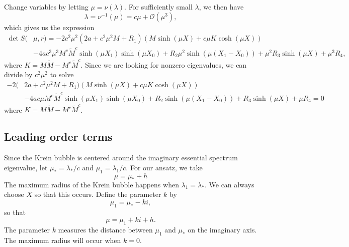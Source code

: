 \documentclass[10pt,reqno]{amsart}
\theoremstyle{plain}
\theoremstyle{definition}
\theoremstyle{remark}
\numberwithin{theorem}{section}
\numberwithin{equation}{section}
\begin{document}
Change variables by letting $\mu = \nu(\lambda)$. For sufficiently small $\lambda$, we then have
\begin{equation}\label{lambdamu}
\lambda = \nu^{-1}(\mu) = c \mu + \mathcal{O}(\mu^3),
\end{equation}
which gives us the expression
\begin{equation}\label{det2}
\begin{aligned}
\det S(&\mu, r) = -2 c^2 \mu^2 (2a + c^2 \mu^2 M + R_1) \left( M \sinh(\mu X) + c \mu K \cosh(\mu X) \right) \\
&-4 a c^3 \mu^3 M^c \tilde{M}^c \sinh(\mu X_1)\sinh(\mu X_0) 
+ R_2 \mu^2 \sinh(\mu(X_1 - X_0)) + \mu^2 R_3 \sinh(\mu X) + \mu^3 R_4,
\end{aligned}
\end{equation}
where $K = M \tilde{M} - M^c \tilde{M}^c$. Since we are looking for nonzero eigenvalues, we can divide by $c^2 \mu^2$ to solve
\begin{equation}\label{det3}
\begin{aligned}
-2 (&2a + c^2 \mu^2 M + R_1) \left( M \sinh(\mu X) + c \mu K \cosh(\mu X) \right) \\
&-4 a c \mu M^c \tilde{M}^c \sinh(\mu X_1)\sinh(\mu X_0) 
+ R_2 \sinh(\mu(X_1 - X_0)) + R_3 \sinh(\mu X) + \mu R_4 = 0
\end{aligned}
\end{equation}
where $K = M \tilde{M} - M^c \tilde{M}^c$.

\subsection{Leading order terms}

Since the Krein bubble is centered around the imaginary essential spectrum eigenvalue, let $\mu_* = \lambda_* / c$ and $\mu_1 = \lambda_1 /c$. For our ansatz, we take
\[
\mu = \mu_* + h
\]
The maximum radius of the Krein bubble happens when $\lambda_1 = \lambda_*$. We can always choose $X$ so that this occurs. Define the parameter $k$ by
\[
\mu_1 = \mu_* - k i,
\]
so that 
\[
\mu = \mu_1 + k i + h.
\]
The parameter $k$ measures the distance between $\mu_1$ and $\mu_*$ on the imaginary axis. The maximum radius will occur when $k = 0$. 
\end{document}
